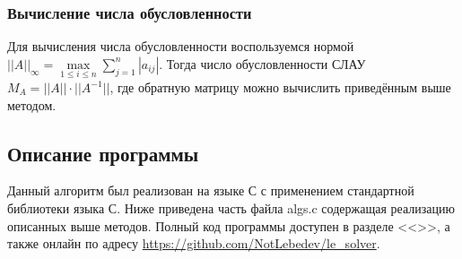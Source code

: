\documentclass[a4paper,12pt,titlepage,finall]{article}
\begin{document}
\subsubsection{Вычисление числа обусловленности}
Для вычисления числа обусловленности воспользуемся нормой $||A||_{\infty } = \max\limits_{1 \leq i \leq n} \sum\limits_{j=1}^n |a_{ij}|$. Тогда число обусловленности СЛАУ $M_A=||A|| \cdot ||A^{-1}||$, где обратную матрицу можно вычислить приведённым выше методом.
\subsection{Описание программы}
Данный алгоритм был реализован на языке С с применением стандартной библиотеки языка С. Ниже приведена часть файла algs.c содержащая реализацию описанных выше методов. Полный код программы доступен в разделе <<>>, а также онлайн по адресу \url{https://github.com/NotLebedev/le_solver}.

\end{document}
